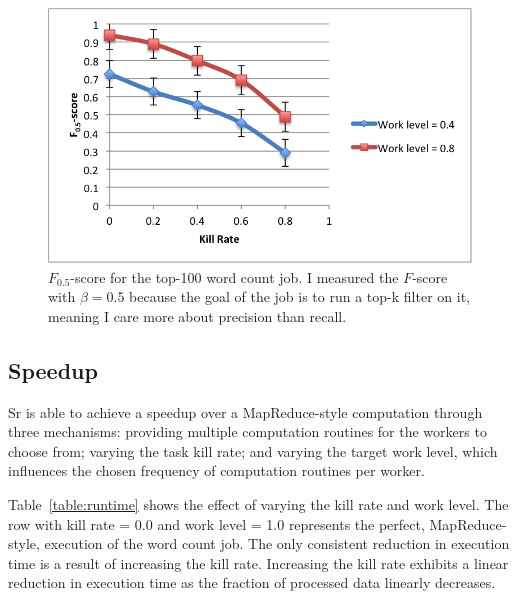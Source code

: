 \documentclass[12pt]{article}
\begin{document}
\begin{figure}
\includegraphics[width=\linewidth]{f-score.png}
\caption{$F_{0.5}$-score for the top-100 word count job. I measured the $F$-score with $\beta = 0.5$ because the goal of the job is to run a top-k filter on it, meaning I care more about precision than recall.}
\label{fig:fscore}
\end{figure}

\subsection{Speedup}
Sr is able to achieve a speedup over a MapReduce-style computation through three mechanisms: providing multiple computation routines for the workers to choose from; varying the task kill rate; and varying the target work level, which influences the chosen frequency of computation routines per worker.

Table~\ref{table:runtime} shows the effect of varying the kill rate and work level. The row with kill rate = 0.0 and work level = 1.0 represents the perfect, MapReduce-style, execution of the word count job. The only consistent reduction in execution time is a result of increasing the kill rate. Increasing the kill rate exhibits a linear reduction in execution time as the fraction of processed data linearly decreases.
\end{document}

